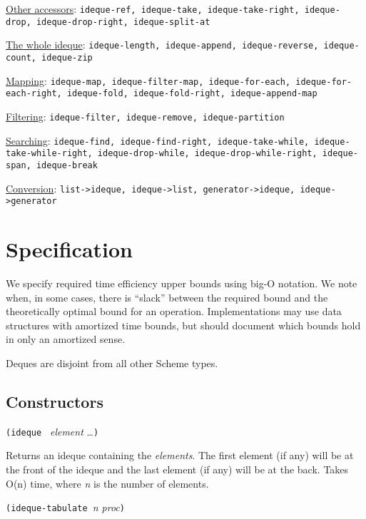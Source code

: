 \protect\hyperlink{Otheraccessors}{Other accessors}:
\texttt{ideque-ref,\ ideque-take,\ ideque-take-right,\ ideque-drop,\ ideque-drop-right,\ ideque-split-at}

\protect\hyperlink{Thewholedeque}{The whole ideque}:
\texttt{ideque-length,\ ideque-append,\ ideque-reverse,\ ideque-count,\ ideque-zip}

\protect\hyperlink{Mapping}{Mapping}:
\texttt{ideque-map,\ ideque-filter-map,\ ideque-for-each,\ ideque-for-each-right,\ ideque-fold,\ ideque-fold-right,\ ideque-append-map}

\protect\hyperlink{Filtering}{Filtering}:
\texttt{ideque-filter,\ ideque-remove,\ ideque-partition}

\protect\hyperlink{Searching}{Searching}:
\texttt{ideque-find,\ ideque-find-right,\ ideque-take-while,\ ideque-take-while-right,\ ideque-drop-while,\ ideque-drop-while-right,\ ideque-span,\ ideque-break}

\protect\hyperlink{Conversion}{Conversion}:
\texttt{list-\textgreater{}ideque,\ ideque-\textgreater{}list,\ generator-\textgreater{}ideque,\ ideque-\textgreater{}generator}

\section{Specification}\label{specification}

We specify required time efficiency upper bounds using big-O notation.
We note when, in some cases, there is ``slack'' between the required
bound and the theoretically optimal bound for an operation.
Implementations may use data structures with amortized time bounds, but
should document which bounds hold in only an amortized sense.

Deques are disjoint from all other Scheme types.

\hypertarget{Constructors}{\subsection{Constructors}\label{Constructors}}

\texttt{(ideque\ } \emph{element} \ldots{}\texttt{)}

Returns an ideque containing the \emph{elements}. The first element (if
any) will be at the front of the ideque and the last element (if any)
will be at the back. Takes O(n) time, where \emph{n} is the number of
elements.

\texttt{(ideque-tabulate\ }\emph{n proc}\texttt{)}

